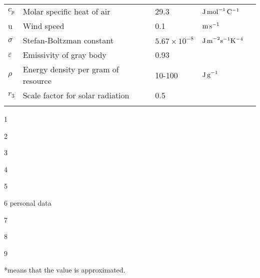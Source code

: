 \begin{table}
\begin{threeparttable}[b]
\begin{tabular}{l l l l l}
$c_p$ & Molar specific heat of air  & 29.3 &  $\rm{J \, mol}^ {-1} \, \rm{C}^ {-1}$ & \tnote{9} \\
u &  Wind speed & 0.1 & $\rm{m \, s}^{-1}$ & \\
$\sigma$ & Stefan-Boltzman constant & $5.67 \times 10^{-8}$ &  $\rm{J \, m}^{-2} \rm{s}^{-1} \rm{K}^{-4}  $  &  \\
$\varepsilon$& Emissivity of gray body & 0.93& & \tnote{9} \\
$\rho$ & Energy density per gram of resource & 10-100 &  $\rm{J \, g}^{-1}$  &  \\  %
$r_3$  & Scale factor for solar radiation & 0.5 &  &  \\
\hline
\label{table:table1}
\end{tabular}
\begin{tablenotes}
  \item[1] \citet{Heinrich1975}
  \item[2] \citet{Kleiber1947,Peters1986,Gillooly2001}
  \item[3] \citet{Bartholomew1981,Niitepold2010}
  \item[4] \citet{Pawar2012, Nervo2014, Maino2015}
  \item[5] \citet{Bartholomew1977a}
  \item[6] personal data
  \item[7] \citet{Bartholomew1977b}
  \item[8] \citet{Kammer1974}
  \item[9] \citet{Campbell2012}
\end{tablenotes}
\end{threeparttable}
\raggedright{*means that the value is approximated.}
\end{table}
